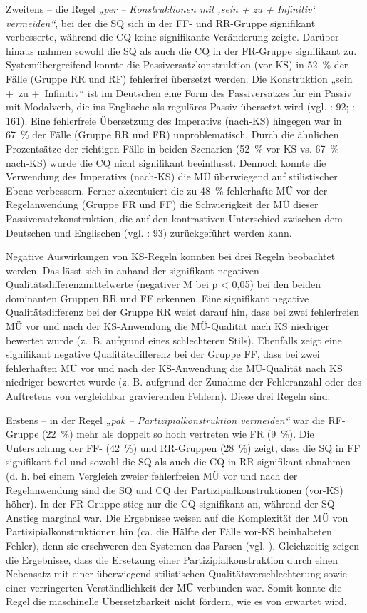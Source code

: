 Zweitens -- die Regel \textit{„per -- Konstruktionen mit ‚sein + zu + Infinitiv‘ vermeiden“}, bei der die SQ sich in der FF- und RR-Gruppe signifikant verbesserte, während die CQ keine signifikante Veränderung zeigte. Darüber hinaus nahmen sowohl die SQ als auch die CQ in der FR-Gruppe signifikant zu. Systemübergreifend konnte die Passiversatzkonstruktion (vor-KS) in 52~\% der Fälle (Gruppe RR und RF) fehlerfrei übersetzt werden. Die Konstruktion „sein +~zu +~Infinitiv“ ist im Deutschen eine Form des Passiversatzes für ein Passiv mit Modalverb, die ins Englische als reguläres Passiv übersetzt wird (vgl. \citealt{Teich2003}: 92; \citealt{KönigGast2012}: 161). Eine fehlerfreie Übersetzung des Imperativs (nach-KS) hingegen war in 67~\% der Fälle (Gruppe RR und FR) unproblematisch. Durch die ähnlichen Prozentsätze der richtigen Fälle in beiden Szenarien (52~\% vor-KS vs. 67~\% nach-KS) wurde die CQ nicht signifikant beeinflusst. Dennoch konnte die Verwendung des Imperativs (nach-KS) die MÜ überwiegend auf stilistischer Ebene verbessern. Ferner akzentuiert die zu 48~\% fehlerhafte MÜ vor der Regelanwendung (Gruppe FR und FF) die Schwierigkeit der MÜ dieser Passiversatzkonstruktion, die auf den kontrastiven Unterschied zwischen dem Deutschen und Englischen (vgl. \citealt{Teich2003}: 93) zurückgeführt werden kann.

Negative Auswirkungen von KS-Regeln konnten bei drei Regeln beobachtet werden. Das lässt sich in   anhand der signifikant negativen Qualitätsdifferenzmittelwerte (negativer M bei p < 0,05) bei den beiden dominanten Gruppen RR und FF erkennen. Eine signifikant negative Qualitätsdifferenz bei der Gruppe RR weist darauf hin, dass bei zwei fehlerfreien MÜ vor und nach der KS-Anwendung die MÜ\nobreakdash-Qualität nach KS niedriger bewertet wurde (z.~B. aufgrund eines schlechteren Stils). Ebenfalls zeigt eine signifikant negative Qualitätsdifferenz bei der Gruppe FF, dass bei zwei fehlerhaften MÜ vor und nach der KS-Anwendung die MÜ-Qualität nach KS niedriger bewertet wurde (z. B. aufgrund der Zunahme der Fehleranzahl oder des Auftretens von vergleichbar gravierenden Fehlern). Diese drei Regeln sind:

Erstens -- in der Regel \textit{„pak -- Partizipialkonstruktion vermeiden“} war die RF-Gruppe (22~\%) mehr als doppelt so hoch vertreten wie FR (9~\%). Die Untersuchung der FF- (42~\%) und RR-Gruppen (28~\%) zeigt, dass die SQ in FF signifikant fiel und sowohl die SQ als auch die CQ in RR signifikant abnahmen (d. h. bei einem Vergleich zweier fehlerfreien MÜ vor und nach der Regelanwendung sind die SQ und CQ der Partizipialkonstruktionen (vor-KS) höher). In der FR-Gruppe stieg nur die CQ signifikant an, während der SQ-Anstieg marginal war. Die Ergebnisse weisen auf die Komplexität der MÜ von Partizipialkonstruktionen hin (ca. die Hälfte der Fälle vor-KS beinhalteten Fehler), denn sie erschweren den Systemen das Parsen (vgl. \citealt{Reuther2003}). Gleichzeitig zeigen die Ergebnisse, dass die Ersetzung einer Partizipialkonstruktion durch einen Nebensatz mit einer überwiegend stilistischen Qualitätsverschlechterung sowie einer verringerten Verständlichkeit der MÜ verbunden war. Somit konnte die Regel die maschinelle Übersetzbarkeit nicht fördern, wie es von \citet{BernthGdaniec2001} erwartet wird.


